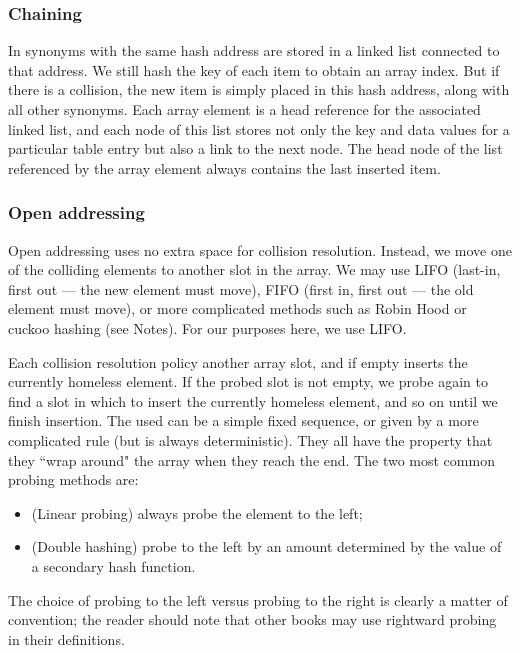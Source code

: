 \subsubsection{Chaining}

In  synonyms with the same hash address are stored 
in a linked list connected to that address.  We still hash the key of 
each item to obtain an array index. But if there is a collision, 
the new item is simply placed in this hash address, along with all other
synonyms. Each array element is a head reference for the associated linked 
list, and each node of this list stores not only the key and data
values for a particular table entry but also a link to the
next node. The head node of the list referenced by the array
element always contains the last inserted item.

\subsubsection{Open addressing}

Open addressing uses no extra space for collision resolution. Instead, 
we move one of the colliding elements to another slot in the array. We may use
LIFO (last-in, first out --- the new element must move), FIFO (first in, first out 
--- the old element must move), or more complicated methods such as Robin Hood 
or cuckoo hashing (see Notes). For our purposes here, we use LIFO.

Each collision resolution policy  another array slot, and if 
empty inserts the currently homeless element. If the probed slot is not empty, we probe 
again to find a slot in which to insert the currently homeless element, and so on 
until we finish insertion. The  used can be a simple 
fixed sequence, or given by a more complicated rule (but is always deterministic).
They all have the property that they ``wrap around" the array when they reach the 
end. The two most common probing methods are:
\begin{itemize}
\item (Linear probing) always probe the element to the left;
\item (Double hashing) probe to the left by an amount determined by the value of 
a secondary hash function.
\end{itemize}

\begin{note}
The choice of probing to the left versus probing to the right is clearly a 
matter of convention; the reader should note that other books may use rightward
probing in their definitions.
\end{note}

